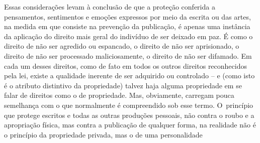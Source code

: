 Essas considerações levam à conclusão de que a proteção conferida a
pensamentos, sentimentos e emoções expressos por meio da escrita ou das
artes, na medida em que consiste na prevenção da publicação, é apenas
uma instância da aplicação do direito mais geral do indivíduo de ser
deixado em paz. É como o direito de não ser agredido ou espancado, o
direito de não ser aprisionado, o direito de não ser processado
maliciosamente, o direito de não ser difamado. Em cada um desses
direitos, como de fato em todos os outros direitos reconhecidos pela
lei, existe a qualidade inerente de ser adquirido ou controlado -- e
(como isto é o atributo distintivo da propriedade) talvez haja alguma
propriedade em se falar de direitos como o de propriedade. Mas,
obviamente, carregam pouca semelhança com o que normalmente é
compreendido sob esse termo. O~princípio que protege escritos e todas as
outras produções pessoais, não contra o roubo e a apropriação física,
mas contra a publicação de qualquer forma, na realidade não é o
princípio da propriedade privada, mas o de uma personalidade
